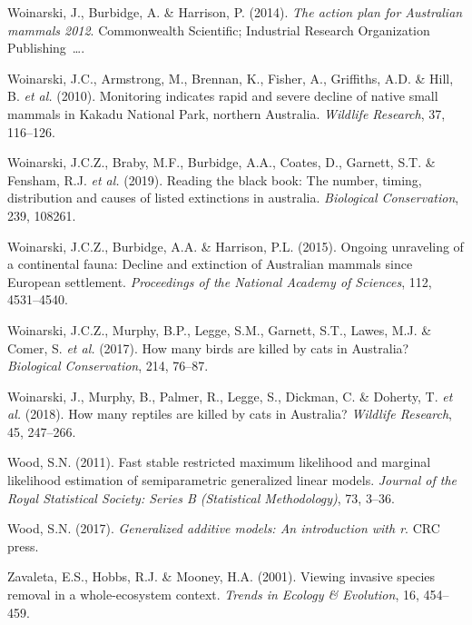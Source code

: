 \documentclass[11pt,a4paper,titlepage,twoside,openright]{style/unimelbthesis}
\begin{document}
\begin{mainmatter}
\leavevmode\hypertarget{ref-woinarski2014action}{}%
Woinarski, J., Burbidge, A. \& Harrison, P. (2014). \emph{The action plan for Australian mammals 2012}. Commonwealth Scientific; Industrial Research Organization Publishing~\ldots.

\leavevmode\hypertarget{ref-woinarski2010monitoring}{}%
Woinarski, J.C., Armstrong, M., Brennan, K., Fisher, A., Griffiths, A.D. \& Hill, B. \emph{et al.} (2010). Monitoring indicates rapid and severe decline of native small mammals in Kakadu National Park, northern Australia. \emph{Wildlife Research}, 37, 116--126.

\leavevmode\hypertarget{ref-woinarski2019reading}{}%
Woinarski, J.C.Z., Braby, M.F., Burbidge, A.A., Coates, D., Garnett, S.T. \& Fensham, R.J. \emph{et al.} (2019). Reading the black book: The number, timing, distribution and causes of listed extinctions in australia. \emph{Biological Conservation}, 239, 108261.

\leavevmode\hypertarget{ref-woinarski2015ongoing}{}%
Woinarski, J.C.Z., Burbidge, A.A. \& Harrison, P.L. (2015). Ongoing unraveling of a continental fauna: Decline and extinction of Australian mammals since European settlement. \emph{Proceedings of the National Academy of Sciences}, 112, 4531--4540.

\leavevmode\hypertarget{ref-woinarski2017birds}{}%
Woinarski, J.C.Z., Murphy, B.P., Legge, S.M., Garnett, S.T., Lawes, M.J. \& Comer, S. \emph{et al.} (2017). How many birds are killed by cats in Australia? \emph{Biological Conservation}, 214, 76--87.

\leavevmode\hypertarget{ref-woinarski2018reptiles}{}%
Woinarski, J., Murphy, B., Palmer, R., Legge, S., Dickman, C. \& Doherty, T. \emph{et al.} (2018). How many reptiles are killed by cats in Australia? \emph{Wildlife Research}, 45, 247--266.

\leavevmode\hypertarget{ref-wood2011fast}{}%
Wood, S.N. (2011). Fast stable restricted maximum likelihood and marginal likelihood estimation of semiparametric generalized linear models. \emph{Journal of the Royal Statistical Society: Series B (Statistical Methodology)}, 73, 3--36.

\leavevmode\hypertarget{ref-wood2017generalized}{}%
Wood, S.N. (2017). \emph{Generalized additive models: An introduction with r}. CRC press.

\leavevmode\hypertarget{ref-zavaleta2001viewing}{}%
Zavaleta, E.S., Hobbs, R.J. \& Mooney, H.A. (2001). Viewing invasive species removal in a whole-ecosystem context. \emph{Trends in Ecology \& Evolution}, 16, 454--459.


\end{mainmatter}
\end{document}
